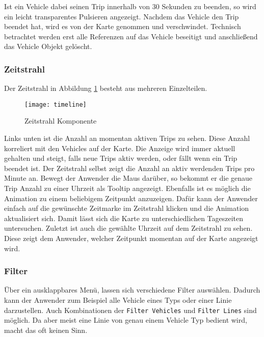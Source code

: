     
    Ist ein Vehicle dabei seinen Trip innerhalb von 30 Sekunden zu beenden, so wird ein leicht transparentes Pulsieren angezeigt. Nachdem das Vehicle den Trip beendet hat, wird es von der Karte genommen und verschwindet. Technisch betrachtet werden erst alle Referenzen auf das Vehicle beseitigt und anschließend das Vehicle Objekt gelöscht.
    

  \subsubsection*{Zeitstrahl}
  \label{ssub:zeitstrahl}
    Der Zeitstrahl in Abbildung \ref{fig:timeline} besteht aus mehreren Einzelteilen. 

    \begin{figure}[htbp]
      \begin{center}
        \texttt{[image: timeline]}
        \caption{Zeitstrahl Komponente}
        \label{fig:timeline}
      \end{center}
    \end{figure}

    Links unten ist die Anzahl an momentan aktiven Trips zu sehen. Diese Anzahl korreliert mit den Vehicles auf der Karte. Die Anzeige wird immer aktuell gehalten und steigt, falls neue Trips aktiv werden, oder fällt wenn ein Trip beendet ist. Der Zeitstrahl selbst zeigt die Anzahl an aktiv werdenden Trips pro Minute an. Bewegt der Anwender die Maus darüber, so bekommt er die genaue Trip Anzahl zu einer Uhrzeit als Tooltip angezeigt. Ebenfalls ist es möglich die Animation zu einem beliebigem Zeitpunkt anzuzeigen. Dafür kann der Anwender einfach auf die gewünschte Zeitmarke im Zeitstrahl klicken und die Animation aktualisiert sich. Damit lässt sich die Karte zu unterschiedlichen Tageszeiten untersuchen. Zuletzt ist auch die gewählte Uhrzeit auf dem Zeitstrahl zu sehen. Diese zeigt dem Anwender, welcher Zeitpunkt momentan auf der Karte angezeigt wird.
    

  \subsubsection*{Filter}
  \label{ssub:filter}
    Über ein ausklappbares Menü, lassen sich verschiedene Filter auswählen. Dadurch kann der Anwender zum Beispiel alle Vehicle eines Typs oder einer Linie darzustellen. Auch Kombinationen der \texttt{Filter Vehicles} und \texttt{Filter Lines} sind möglich. Da aber meist eine Linie von genau einem Vehicle Typ bedient wird, macht das oft keinen Sinn.

